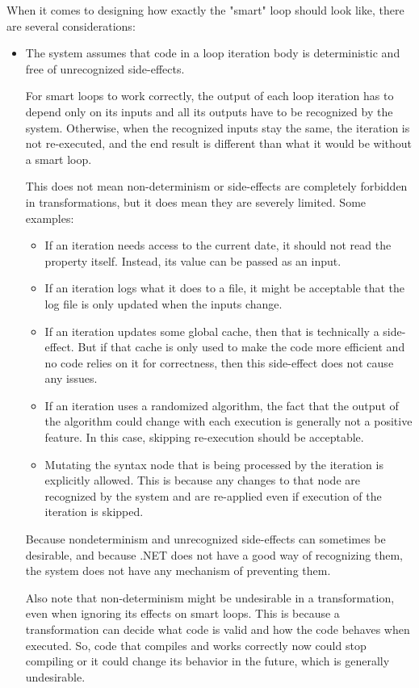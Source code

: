When it comes to designing how exactly the "smart"  loop should look like, there are several considerations:

\begin{itemize}
\item The system assumes that code in a loop iteration body is deterministic and free of unrecognized side-effects.

For smart loops to work correctly, the output of each loop iteration has to depend only on its inputs and all its outputs have to be recognized by the system. Otherwise, when the recognized inputs stay the same, the iteration is not re-executed, and the end result is different than what it would be without a smart loop.

This does not mean non-determinism or side-effects are completely forbidden in transformations, but it does mean they are severely limited. Some examples:

\begin{itemize}
\item If an iteration needs access to the current date, it should not read the  property itself. Instead, its value can be passed as an input.
\item If an iteration logs what it does to a file, it might be acceptable that the log file is only updated when the inputs change.
\item If an iteration updates some global cache, then that is technically a side-effect. But if that cache is only used to make the code more efficient and no code relies on it for correctness, then this side-effect does not cause any issues.
\item If an iteration uses a randomized algorithm, the fact that the output of the algorithm could change with each execution is generally not a positive feature. In this case, skipping re-execution should be acceptable.
\item Mutating the syntax node that is being processed by the iteration is explicitly allowed. This is because any changes to that node are recognized by the system and are re-applied even if execution of the iteration is skipped.
\end{itemize}

Because nondeterminism and unrecognized side-effects can sometimes be desirable, and because .NET does not have a good way of recognizing them, the system does not have any mechanism of preventing them.

Also note that non-determinism might be undesirable in a transformation, even when ignoring its effects on smart loops. This is because a transformation can decide what code is valid and how the code behaves when executed. So, code that compiles and works correctly now could stop compiling or it could change its behavior in the future, which is generally undesirable.


\end{itemize}

